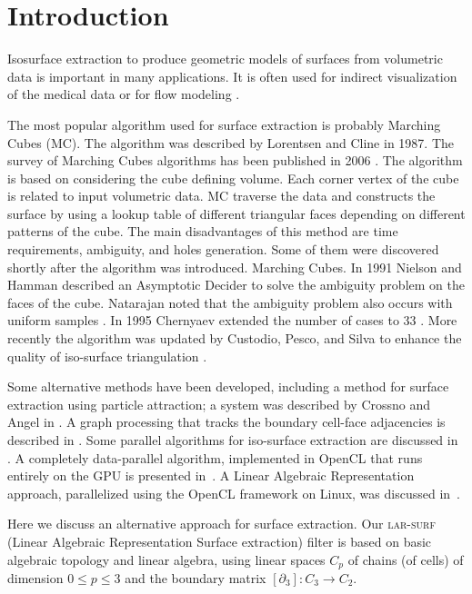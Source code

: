 \section{Introduction}\label{sec:intro}


Isosurface extraction to produce geometric models of surfaces from volumetric data is important in many applications. It is often used for indirect visualization of the medical data or for flow modeling \cite{Rohan2018a}. 
 
The most popular algorithm used for surface extraction is probably Marching Cubes (MC). The algorithm was described by Lorentsen and Cline \cite{Lorensen1987} in 1987. The survey of Marching Cubes algorithms has been published in 2006 \cite{Newman2006}. The algorithm is based on considering the cube defining volume. Each corner vertex of the cube is related to input volumetric data. MC traverse the data and constructs the surface by using a lookup table of different triangular faces depending on different patterns of the cube.  The main disadvantages of this method are time requirements, ambiguity, and holes generation. Some of them were discovered shortly after the algorithm was introduced. 
Marching Cubes. In 1991 Nielson and Hamman described an Asymptotic Decider to solve the ambiguity problem on the faces of the cube.  Natarajan noted that the ambiguity problem also occurs with uniform samples \cite{Natarajan1994}. In 1995 Chernyaev extended the number of cases to 33 \cite{chernyaev1995marching}. More recently the algorithm was updated by Custodio, Pesco, and Silva to enhance the quality of iso-surface triangulation \cite{Custodio2019}. 

Some alternative methods have been developed, including a method for surface extraction using particle attraction; a system was described by Crossno and Angel in \cite{Crossno1997}. A graph processing that tracks the boundary cell-face adjacencies is described in \cite{Lachaud2000}. Some parallel algorithms for iso-surface extraction are discussed in \cite{Bajaj2004}.
A completely data-parallel algorithm, implemented in OpenCL that runs entirely on the GPU is presented in~\cite{Smistad12}. 
A Linear Algebraic Representation approach, parallelized using the OpenCL framework on Linux, was discussed in~\cite{Paoluzzi2016}. %

Here we discuss an alternative approach for surface extraction. Our \textsc{lar-surf} (Linear Algebraic Representation Surface extraction) filter is based on basic algebraic topology and linear algebra, using linear spaces $C_p$ of chains (of cells) of dimension $0 \leq p \leq 3$ and the boundary matrix $[\partial_3] : C_3 \to C_2$.


